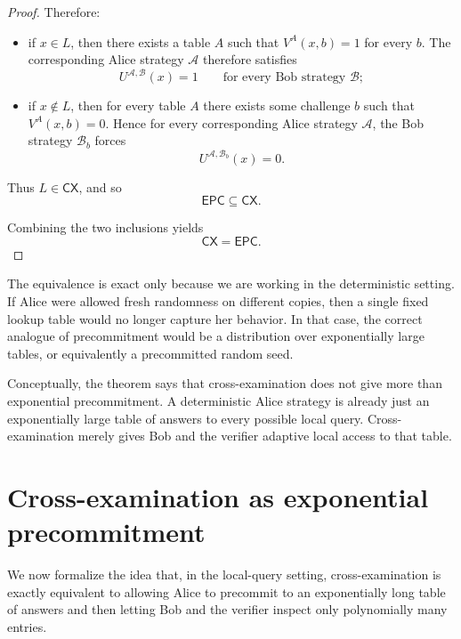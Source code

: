 \documentclass[11pt]{article}
\begin{document}
\begin{proof}
Therefore:
\begin{itemize}
    \item if \(x \in L\), then there exists a table \(A\) such that \(V^A(x,b)=1\) for every \(b\). The corresponding Alice strategy \(\mathcal A\) therefore satisfies
    \[
    U^{\mathcal A,\mathcal B}(x)=1
    \qquad
    \text{for every Bob strategy } \mathcal B;
    \]
    \item if \(x \notin L\), then for every table \(A\) there exists some challenge \(b\) such that \(V^A(x,b)=0\). Hence for every corresponding Alice strategy \(\mathcal A\), the Bob strategy \(\mathcal B_b\) forces
    \[
    U^{\mathcal A,\mathcal B_b}(x)=0.
    \]
\end{itemize}

Thus \(L \in \mathsf{CX}\), and so
\[
\mathsf{EPC} \subseteq \mathsf{CX}.
\]

Combining the two inclusions yields
\[
\mathsf{CX} = \mathsf{EPC}.
\]
\end{proof}

\begin{remark}
The equivalence is exact only because we are working in the deterministic setting. If Alice were allowed fresh randomness on different copies, then a single fixed lookup table would no longer capture her behavior. In that case, the correct analogue of precommitment would be a distribution over exponentially large tables, or equivalently a precommitted random seed.
\end{remark}

\begin{remark}
Conceptually, the theorem says that cross-examination does not give more than exponential precommitment. A deterministic Alice strategy is already just an exponentially large table of answers to every possible local query. Cross-examination merely gives Bob and the verifier adaptive local access to that table.
\end{remark}


\section{Cross-examination as exponential precommitment}

We now formalize the idea that, in the local-query setting, cross-examination is
exactly equivalent to allowing Alice to precommit to an exponentially long table of
answers and then letting Bob and the verifier inspect only polynomially many entries.
\end{document}
